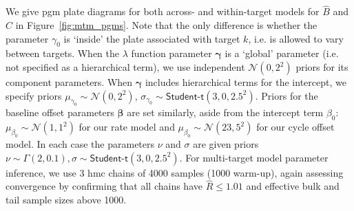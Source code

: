 \documentclass[../thesis.tex]{subfiles}
\begin{document}
We give \gls{pgm} plate diagrams for both across- and within-target models for $\hat{B}$ and $\hat{C}$ in Figure~\ref{fig:mtm_pgms}. Note that the only difference is whether the parameter $\gamma_0$ is `inside' the plate associated with target $k$, i.e. is allowed to vary between targets. When the $\lambda$ function parameter $\bm{\gamma}$ is a `global' parameter (i.e. not specified as a hierarchical term), we use independent $\mathcal{N}(0,2^2)$ priors for its component parameters. When $\bm{\gamma}$ includes hierarchical terms for the intercept, we specify priors $\mu_{\gamma_{0}} \sim \mathcal{N}(0, 2^2)$, $\sigma_{\gamma_{0}} \sim \textsf{Student-t}(3, 0, 2.5^2)$. Priors for the baseline offset parameters $\bm{\beta}$ are set similarly, aside from the intercept term $\beta_0$: $\mu_{\beta_0} \sim \mathcal{N}(1, 1^2)$ for our rate model and $\mu_{\beta_0} \sim \mathcal{N}(23, 5^2)$ for our cycle offset model. In each case the parameters $\nu$ and $\sigma$ are given priors $\nu \sim \Gamma (2, 0.1), \sigma \sim \textsf{Student-t}(3, 0, 2.5^2)$.
For multi-target model parameter inference, we use 3 \gls{hmc} chains of 4000 samples (1000 warm-up), again assessing convergence by confirming that all chains have $\hat{R} \leq 1.01$ and effective bulk and tail sample sizes above 1000.
\end{document}
